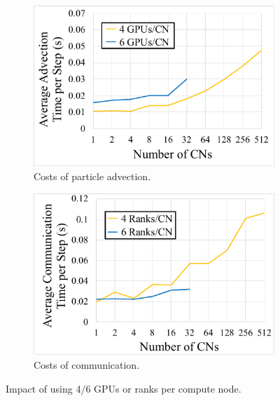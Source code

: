 \begin{figure}[!t]
\begin{subfigure}{0.495\linewidth}
\centering
\includegraphics[width=\linewidth]{Images/advection_time2.pdf}
\caption{Costs of particle advection.}
\label{fig:advection}
\end{subfigure}
\begin{subfigure}{0.495\linewidth}
\centering
\includegraphics[width=\linewidth]{Images/communication_time2.pdf}
\caption{Costs of communication.}
\label{fig:communication}
\end{subfigure}
\caption{Impact of using 4/6 GPUs or ranks per compute node.}
\label{fig:gpu_nodes}
\end{figure}
